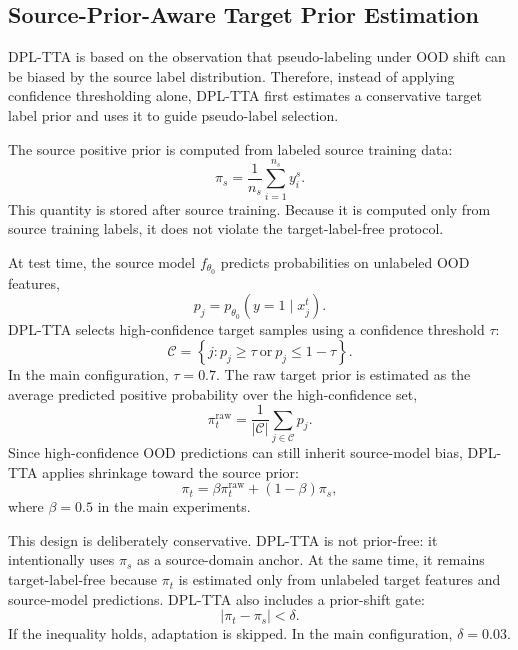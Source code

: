 \documentclass{article}
\begin{document}
\subsection{Source-Prior-Aware Target Prior Estimation}

DPL-TTA is based on the observation that pseudo-labeling under OOD shift can be biased by the source label distribution. Therefore, instead of applying confidence thresholding alone, DPL-TTA first estimates a conservative target label prior and uses it to guide pseudo-label selection.

The source positive prior is computed from labeled source training data:
\begin{equation}
\pi_s
=
\frac{1}{n_s}
\sum_{i=1}^{n_s} y_i^{s}.
\label{eq:source_prior}
\end{equation}
This quantity is stored after source training. Because it is computed only from source training labels, it does not violate the target-label-free protocol.

At test time, the source model $f_{\theta_0}$ predicts probabilities on unlabeled OOD features,
\begin{equation}
p_j
=
p_{\theta_0}(y=1 \mid x_j^{t}).
\label{eq:target_probability}
\end{equation}
DPL-TTA selects high-confidence target samples using a confidence threshold $\tau$:
\begin{equation}
\mathcal{C}
=
\left\{
j :
p_j \geq \tau
\ \mathrm{or}\ 
p_j \leq 1-\tau
\right\}.
\label{eq:confident_set}
\end{equation}
In the main configuration, $\tau=0.7$. The raw target prior is estimated as the average predicted positive probability over the high-confidence set,
\begin{equation}
\pi_t^{\mathrm{raw}}
=
\frac{1}{|\mathcal{C}|}
\sum_{j \in \mathcal{C}} p_j .
\label{eq:raw_target_prior}
\end{equation}
Since high-confidence OOD predictions can still inherit source-model bias, DPL-TTA applies shrinkage toward the source prior:
\begin{equation}
\pi_t
=
\beta \pi_t^{\mathrm{raw}}
+
(1-\beta)\pi_s,
\label{eq:shrunk_target_prior}
\end{equation}
where $\beta=0.5$ in the main experiments.

This design is deliberately conservative. DPL-TTA is not prior-free: it intentionally uses $\pi_s$ as a source-domain anchor. At the same time, it remains target-label-free because $\pi_t$ is estimated only from unlabeled target features and source-model predictions. DPL-TTA also includes a prior-shift gate:
\begin{equation}
\left|\pi_t - \pi_s\right| < \delta .
\label{eq:prior_shift_gate}
\end{equation}
If the inequality holds, adaptation is skipped. In the main configuration, $\delta=0.03$.
\end{document}
